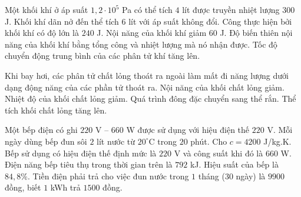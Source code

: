 \begin{ex}
Một khối khí ở áp suất $1,2\cdot10^5$ Pa có thể tích $4$ lít được truyền nhiệt lượng $300$ J. Khối khí dãn nở đến thể tích $6$ lít với áp suất không đổi.
\choiceTF
{\True Công thực hiện bởi khối khí có độ lớn là $240$ J.}
{Nội năng của khối khí giảm $60$ J.}
{\True Độ biến thiên nội năng của khối khí bằng tổng công và nhiệt lượng mà nó nhận được.}
{\True Tốc độ chuyển động trung bình của các phân tử khí tăng lên.}
\end{ex}

\begin{ex}
Khi bay hơi, các phân tử chất lỏng thoát ra ngoài làm mất đi năng lượng dưới dạng động năng của các phần tử thoát ra.
\choiceTF
{\True Nội năng của khối chất lỏng giảm.}
{\True Nhiệt độ của khối chất lỏng giảm.}
{Quá trình đông đặc chuyển sang thể rắn.}
{Thể tích khối chất lỏng tăng lên.}
\end{ex}

\begin{ex}
Một bếp điện có ghi $220$ V -- $660$ W được sử dụng với hiệu điện thế $220$ V. Mỗi ngày dùng bếp đun sôi $2$ lít nước từ $20^\circ\mathrm{C}$ trong $20$ phút. Cho $c=4200$ J/kg.K.
\choiceTF
{\True Bếp sử dụng có hiệu điện thế định mức là $220$ V và công suất khi đó là $660$ W.}
{\True Điện năng bếp tiêu thụ trong thời gian trên là $792$ kJ.}
{\True Hiệu suất của bếp là $84,8\%$.}
{\True Tiền điện phải trả cho việc đun nước trong $1$ tháng (30 ngày) là $9900$ đồng, biết $1$ kWh trả $1500$ đồng.}
\end{ex}

